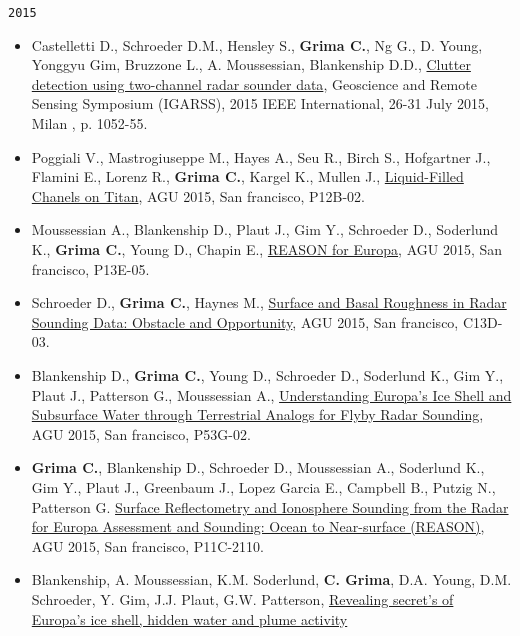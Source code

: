 \noindent\texttt{2015}

\begin{itemize}
\item
  Castelletti D., Schroeder D.M., Hensley S., \textbf{Grima C.}, Ng G.,
  D. Young, Yonggyu Gim, Bruzzone L., A. Moussessian, Blankenship D.D.,
  \href{http://ieeexplore.ieee.org/xpl/articleDetails.jsp?reload=true\&arnumber=7325950}{Clutter
  detection using two-channel radar sounder data}, Geoscience and Remote
  Sensing Symposium (IGARSS), 2015 IEEE International, 26-31 July 2015,
  Milan , p. 1052-55.
\item
  Poggiali V., Mastrogiuseppe M., Hayes A., Seu R., Birch S., Hofgartner
  J., Flamini E., Lorenz R., \textbf{Grima C.}, Kargel K., Mullen J.,
  \href{https://agu.confex.com/agu/fm15/meetingapp.cgi/Paper/83937}{Liquid-Filled
  Chanels on Titan}, AGU 2015, San francisco, P12B-02.
\item
  Moussessian A., Blankenship D., Plaut J., Gim Y., Schroeder D.,
  Soderlund K., \textbf{Grima C.}, Young D., Chapin E.,
  \href{https://agu.confex.com/agu/fm15/meetingapp.cgi/Paper/84483}{REASON
  for Europa}, AGU 2015, San francisco, P13E-05.
\item
  Schroeder D., \textbf{Grima C.}, Haynes M.,
  \href{https://agu.confex.com/agu/fm15/meetingapp.cgi/Paper/61923}{Surface
  and Basal Roughness in Radar Sounding Data: Obstacle and Opportunity},
  AGU 2015, San francisco, C13D-03.
\item
  Blankenship D., \textbf{Grima C.}, Young D., Schroeder D., Soderlund
  K., Gim Y., Plaut J., Patterson G., Moussessian A.,
  \href{https://agu.confex.com/agu/fm15/meetingapp.cgi/Paper/85704}{Understanding
  Europa's Ice Shell and Subsurface Water through Terrestrial Analogs
  for Flyby Radar Sounding}, AGU 2015, San francisco, P53G-02.
\item
  \textbf{Grima C.}, Blankenship D., Schroeder D., Moussessian A.,
  Soderlund K., Gim Y., Plaut J., Greenbaum J., Lopez Garcia E.,
  Campbell B., Putzig N., Patterson G.
  \href{https://agu.confex.com/agu/fm15/meetingapp.cgi/Paper/83156}{Surface
  Reflectometry and Ionosphere Sounding from the Radar for Europa
  Assessment and Sounding: Ocean to Near-surface (REASON)}, AGU 2015,
  San francisco, P11C-2110.
\item
  Blankenship, A. Moussessian, K.M. Soderlund, \textbf{C. Grima}, D.A.
  Young, D.M. Schroeder, Y. Gim, J.J. Plaut, G.W. Patterson,
  \href{http://www.hou.usra.edu/meetings/abscicon2015/pdf/7627.pdf}{Revealing
  secret's of Europa's ice shell, hidden water and plume activity
}
\end{itemize}
